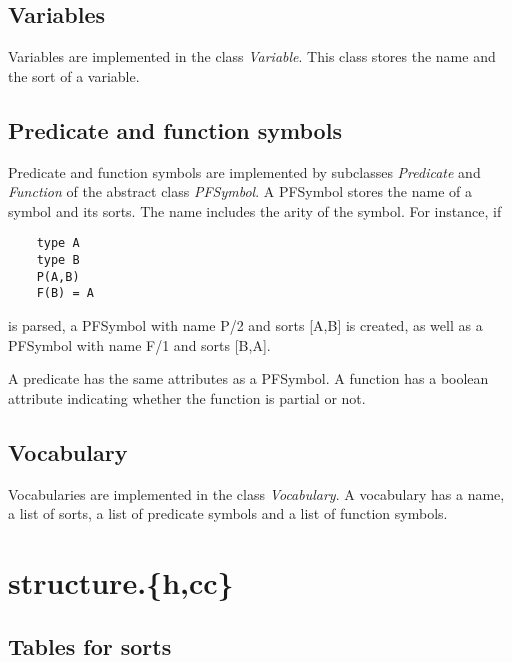 \documentclass{article}
\begin{document}
\subsection*{Variables}

Variables are implemented in the class \emph{Variable}. This class stores the name and the sort of a variable.

\subsection*{Predicate and function symbols}

Predicate and function symbols are implemented by subclasses \emph{Predicate} and \emph{Function} of the abstract class \emph{PFSymbol}. A PFSymbol stores the name of a symbol and its sorts. The name includes the arity of the symbol. For instance, if
\begin{lstlisting}
	type A
	type B
	P(A,B)
	F(B) = A
\end{lstlisting}
is parsed, a PFSymbol with name P/2 and sorts [A,B] is created, as well as a PFSymbol with name F/1 and sorts [B,A].

A predicate has the same attributes as a PFSymbol. A function has a boolean attribute indicating whether the function is partial or not.

\subsection*{Vocabulary}

Vocabularies are implemented in the class \emph{Vocabulary}. A vocabulary has a name, a list of sorts, a list of predicate symbols and a list of function symbols.

\section{structure.\{h,cc\}}

\subsection*{Tables for sorts}
\end{document}
